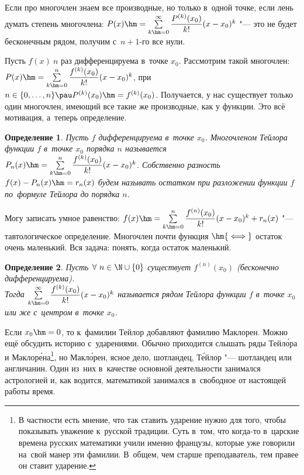 \documentclass[a4paper,10pt,twoside]{article}
\newtheorem{Def}{Определение}[section]
\begin{document}
Если про многочлен знаем все производные, но только в~одной точке, если лень думать степень многочлена: $P(x)\hm=\sum\limits_{k\hm=0}^{\infty}\dfrac
{P^{(k)}(x_0)}{k!}(x-x_0)^k$ "--- это не будет бесконечным рядом, получим с~$n+1$-го все нули.

Пусть $f(x)\ n$ раз дифференцируема в~точке $x_0$. Рассмотрим такой многочлен:
$P(x)\hm=\sum\limits_{k\hm=0}^n\dfrac{f^{(k)}(x_0)}{k!}(x-x_0)^k$, при $n\in\{0,\ldots,n\}\pau P^{(k)}(x_0)\hm=f^{(k)}(x_0)$.
Получается, у нас существует только один
многочлен, имеющий все такие же производные, как у функции. Это всё мотивация, а~теперь определение.

\begin{Def}
    Пусть $f$ дифференцируема в~точке $x_0$. Многочленом Тейлора функции $f$ в~точке $x_0$ порядка $n$ называется $P_n(x)\hm=\sum\limits_{k\hm=0}^n
    \dfrac{f^{(k)}(x_0)}{k!}(x-x_0)^k$. Собственно разность $f(x)-P_n(x)\hm=r_n(x)$ будем называть остатком при разложении функции $f$ по~формуле Тейлора до порядка $n$.
\end{Def}

Могу записать умное равенство: $f(x)\hm=\sum\limits_{k\hm=0}^n\dfrac{f^{(n)}(x_0)}{k!}(x-x_0)^k+r_n(x)$ "--- тавтологическое определение.
Многочлен почти функция $\hm{\iff}$ остаток очень маленький. Вся задача: понять, когда остаток маленький.

\begin{Def}
    Пусть $\forall\  n\in\N\cup\{0\}$ существует $f^{(n)}(x_0)$ (бесконечно дифференцируема).\\ Тогда $\sum\limits_{k\hm=0}^{\infty}\dfrac{f^{(k)}(x_0)}{k!}(x-x_0)^k$
    называется рядом Тейлора функции $f$ в~точке $x_0$ или же с~центром в~точке $x_0$.
\end{Def}

Если $x_0\hm=0$, то к~фамилии Тейлор добавляют фамилию Маклорен. Можно ещё обсудить историю с~ударениями. Обычно приходится слышать ряды Тейл\'{о}ра и Маклор\'{е}на\footnote{
В частности есть мнение, что так ставить ударение нужно для того, чтобы показывать уважение к~русской традиции. Суть в~том, что когда-то в~царские
времена русских математики учили именно французы, которые уже говорили на~свой манер эти фамилии. В~общем, чем старше преподаватель, тем
правее он ставит ударение.
},
но Макл\'{о}рен, ясное дело, шотландец, Т\'{е}йлор "--- шотландец или англичанин. Один из~них в~качестве основной деятельности занимался астрологией и, как
водится, математикой занимался в~свободное от настоящей работы время.
\end{document}
